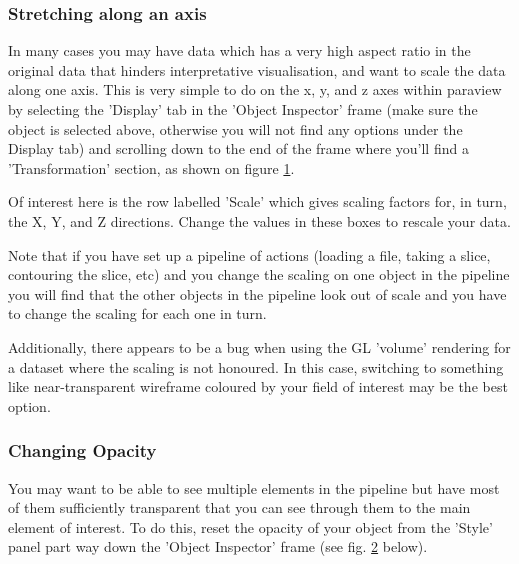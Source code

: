 \subsubsection{Stretching along an axis}

In many cases you may have data which has a very high aspect ratio in the original data that hinders interpretative visualisation, and want to scale the data along one axis. This is very simple to do on the x, y, and z axes within paraview by selecting the 'Display' tab in the 'Object Inspector' frame (make sure the object is selected above, otherwise you will not find any options under the Display tab) and scrolling down to the end of the frame where you'll find a 'Transformation' section, as shown on figure \ref{paraview8}.

\begin{figure}[h!]
\label{paraview8}
  \centering
\end{figure}

Of interest here is the row labelled 'Scale' which gives scaling factors for, in turn, the X, Y, and Z directions. Change the values in these boxes to rescale your data.

Note that if you have set up a pipeline of actions (loading a file, taking a slice, contouring the slice, etc) and you change the scaling on one object in the pipeline you will find that the other objects in the pipeline look out of scale and you have to change the scaling for each one in turn.

Additionally, there appears to be a bug when using the GL 'volume' rendering for a dataset where the scaling is not honoured. In this case, switching to something like near-transparent wireframe coloured by your field of interest may be the best option.

\subsubsection{Changing Opacity}

You may want to be able to see multiple elements in the pipeline but have most of them sufficiently transparent that you can see through them to the main element of interest. To do this, reset the opacity of your object from the 'Style' panel part way down the 'Object Inspector' frame (see fig. \ref{paraview9} below).

\begin{figure}[h!]
\label{paraview9}
  \centering
\end{figure}

